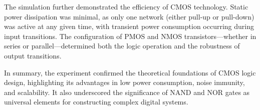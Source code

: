 \documentclass[12pt]{article}
\begin{document}
The simulation further demonstrated the efficiency of CMOS technology. Static power dissipation was minimal, as only one network (either pull-up or pull-down) was active at any given time, with transient power consumption occurring during input transitions. The configuration of PMOS and NMOS transistors—whether in series or parallel—determined both the logic operation and the robustness of output transitions.

In summary, the experiment confirmed the theoretical foundations of CMOS logic design, highlighting its advantages in low power consumption, noise immunity, and scalability. It also underscored the significance of NAND and NOR gates as universal elements for constructing complex digital systems.


\renewcommand{\bibname}{References}

\end{document}
